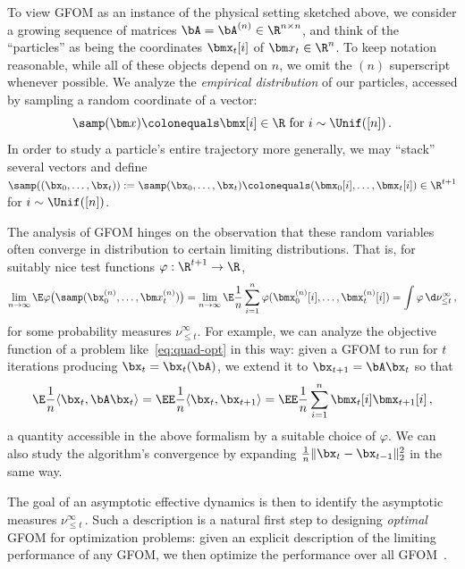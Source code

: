To view GFOM as an instance of the physical setting sketched above, we consider a growing sequence of matrices $\bA = \bA^{(n)} \in \R^{n \times n}$, and think of the ``particles'' as being the coordinates $\bmx_{t}[i]$ of $\bm x_t \in \R^n$.
To keep notation reasonable, while all of these objects depend on $n$, we omit the $(n)$ superscript whenever possible.
We analyze the \emph{empirical distribution} of our particles, accessed by sampling a random coordinate of a vector:
\[ \samp(\bm x) \colonequals \bmx[i] \in \R \text{ for } i \sim \Unif([n])\,. \]
In order to study a particle's entire trajectory more generally, we may ``stack'' several vectors
and define $\samp((\bx_0, \dots, \bx_t)) := \samp(\bx_0, \dots, \bx_t) \colonequals (\bmx_0[i],\dots, \bmx_t[i]) \in \R^{t + 1}$ for $i \sim \Unif([n])$.

The analysis of GFOM hinges on the observation that these random variables often converge in distribution to certain limiting distributions.
That is, for suitably nice test functions $\varphi: \R^{t + 1} \to \R$,
\[ \lim_{n \to \infty} \E \varphi\big(\samp(\bx_0^{(n)}, \dots, \bm x_t^{(n)})\big) = \lim_{n \to \infty} \E \frac{1}{n} \sum_{i = 1}^n \varphi(\bmx_{0}^{(n)}[i], \dots, \bmx_{t}^{(n)}[i]) = \int \varphi \,\d\nu_{\leq t}^{\infty}\,, \]
for some probability measures $\nu_{\leq t}^{\infty}$.
For example, we can analyze the objective function of a problem like~\cref{eq:quad-opt} in this way: given a GFOM to run for $t$ iterations producing $\bx_t = \bx_t(\bA)$, we extend it to $\bx_{t + 1} = \bA \bx_t$ so that
\[ \E \frac{1}{n}\langle \bx_t, \bA \bx_t\rangle = \EE \frac{1}{n}\langle \bx_t, \bx_{t + 1}\rangle = \EE \frac{1}{n}\sum_{i = 1}^n \bmx_{t}[i] \bmx_{t + 1}[i]\,, \]
a quantity accessible in the above formalism by a suitable choice of $\varphi$.
We can also study the algorithm's convergence by expanding $\frac{1}{n}\|\bx_t - \bx_{t - 1}\|^2_2$ in the same way.

The goal of an asymptotic effective dynamics is then to identify the asymptotic measures $\nu_{\leq t}^{\infty}$\,.
Such a description is a natural first step to designing {\em optimal} GFOM for optimization problems: given an explicit description of the limiting performance of any GFOM, we then optimize the performance over all GFOM~\cite{celentano2020estimation, AMS20:pSpinGlasses, montanari2022equivalence,pesentiThesis}.


